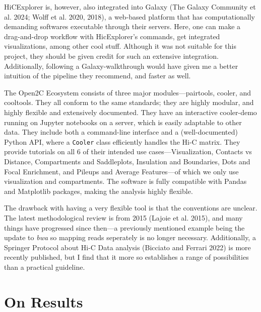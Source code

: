 \documentclass[
  11pt,
  a4paper,
]{scrbook}
\begin{document}
HiCExplorer is, however, also integrated into Galaxy (The Galaxy
Community et al. 2024; Wolff et al. 2020, 2018), a web-based platform
that has computationally demanding softwares executable through their
servers. Here, one can make a drag-and-drop workflow with HicExplorer's
commands, get integrated visualizations, among other cool stuff.
Although it was not suitable for this project, they should be given
credit for such an extensive integration. Additionally, following a
Galaxy-walkthrough would have given me a better intuition of the
pipeline they recommend, and faster as well.

The Open2C Ecosystem consists of three major modules---pairtools,
cooler, and cooltools. They all conform to the same standards; they are
highly modular, and highly flexible and extensively documented. They
have an interactive cooler-demo running on Jupyter notebooks on a
server, which is easily adaptable to other data. They include both a
command-line interface and a (well-documented) Python API, where a
\texttt{Cooler} class efficiently handles the Hi-C matrix. They provide
tutorials on all 6 of their intended use cases---Visualization, Contacts
vs Distance, Compartments and Saddleplots, Insulation and Boundaries,
Dots and Focal Enrichment, and Pileups and Average Features---of which
we only use visualization and compartments. The software is fully
compatible with Pandas and Matplotlib packages, making the analysis
highly flexible.

The drawback with having a very flexible tool is that the conventions
are unclear. The latest methodological review is from 2015 (Lajoie et
al. 2015), and many things have progressed since then---a previously
mentioned example being the update to \emph{bwa} so mapping reads
seperately is no longer necessary. Additionally, a Springer Protocol
about Hi-C Data analysis (Bicciato and Ferrari 2022) is more recently
published, but I find that it more so establishes a range of
possibilities than a practical guideline.

\section{On Results}\label{on-results}
\end{document}
